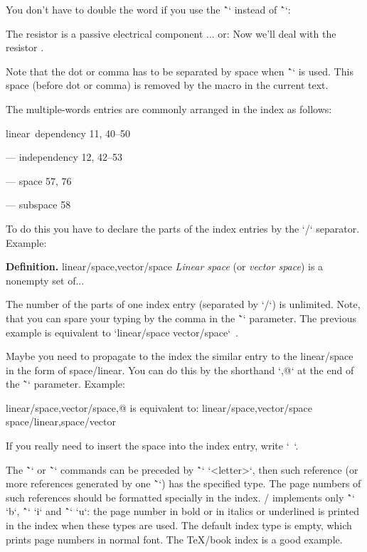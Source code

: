 {You don't have to double the word if you use the \^`\iid` instead of \^`\ii`:

\begtt
The \iid resistor is a passive electrical component ...
or:
Now we'll deal with the \iid resistor .
\endtt

Note that the dot or comma has to be separated by space when \^`\iid` is
used. This space (before dot or comma) is removed by the macro in
the current text.

The multiple-words entries are commonly arranged in the index as follows:

\medskip

linear~dependency  11, 40--50

--- independency 12, 42--53

--- space 57, 76

--- subspace 58

\medskip

To do this you have to declare the parts of the index entries by the `/` separator.
Example:

\begtt
{\bf Definition.}
\ii linear/space,vector/space
{\em Linear space} (or {\em vector space}) is a nonempty set of...
\endtt

The number of the parts of one index entry (separated by `/`) is unlimited. Note, that you can
spare your typing by the comma in the \~`\ii` parameter. The previous example
is equivalent to `\ii linear/space \ii vector/space`~.

Maybe you need to propagate to the index the similar entry to the
linear/space in the form of space/linear. You can do this by the shorthand `,@`
at the end of the \~`\ii` parameter. Example:

\begtt
\ii linear/space,vector/space,@
is equivalent to:
\ii linear/space,vector/space \ii space/linear,space/vector
\endtt

If you really need to insert the space into the index entry, write `~`.

The \~`\ii` or \~`\iid` commands can be preceded by \^`\iitype` `<letter>`, then such
reference (or more references generated by one \~`\ii`) has the specified type.
The page numbers of such references should be formatted
specially in the index. \OpTeX/ implements only \^`\iitype` `b`,
\^`\iitype` `i` and \^`\iitype` `u`:
the page number in bold or in italics or underlined is printed
in the index when these types are used. The default index type is empty, which
prints page numbers in normal font. The \TeX/book index is a good example.

}
